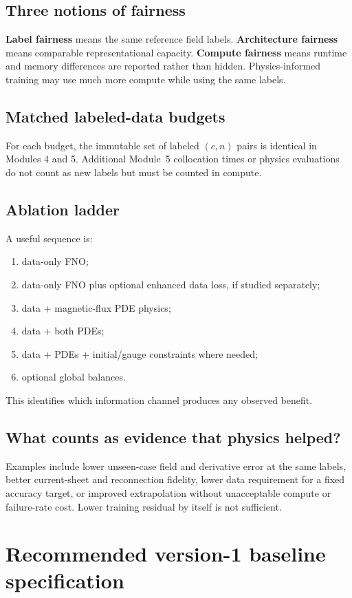 \documentclass[11pt]{article}
\begin{document}
\subsection{Three notions of fairness}
\textbf{Label fairness} means the same reference field labels. \textbf{Architecture fairness} means comparable representational capacity. \textbf{Compute fairness} means runtime and memory differences are reported rather than hidden. Physics-informed training may use much more compute while using the same labels.

\subsection{Matched labeled-data budgets}
For each budget, the immutable set of labeled $(c,n)$ pairs is identical in Modules 4 and 5. Additional Module~5 collocation times or physics evaluations do not count as new labels but must be counted in compute.

\subsection{Ablation ladder}
A useful sequence is:
\begin{enumerate}
  \item data-only FNO;
  \item data-only FNO plus optional enhanced data loss, if studied separately;
  \item data + magnetic-flux PDE physics;
  \item data + both PDEs;
  \item data + PDEs + initial/gauge constraints where needed;
  \item optional global balances.
\end{enumerate}
This identifies which information channel produces any observed benefit.

\subsection{What counts as evidence that physics helped?}
Examples include lower unseen-case field and derivative error at the same labels, better current-sheet and reconnection fidelity, lower data requirement for a fixed accuracy target, or improved extrapolation without unacceptable compute or failure-rate cost. Lower training residual by itself is not sufficient.

\section{Recommended version-1 baseline specification}
\label{sec:spec}
\end{document}
